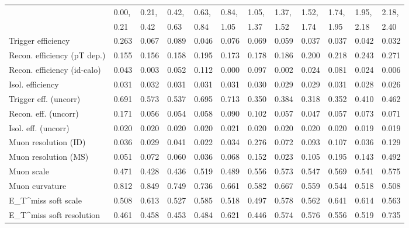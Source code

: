 \begin{tabular}{l|p{0.6cm}p{0.6cm}p{0.6cm}p{0.6cm}p{0.6cm}p{0.6cm}p{0.6cm}p{0.6cm}p{0.6cm}p{0.6cm}p{0.6cm}}
\hline
   & 0.00, & 0.21, & 0.42, & 0.63, & 0.84, & 1.05, & 1.37, & 1.52, & 1.74, & 1.95, & 2.18,  \\ 
   & 0.21 & 0.42 & 0.63 & 0.84 & 1.05 & 1.37 & 1.52 & 1.74 & 1.95 & 2.18 & 2.40  \\ 
\hline
Trigger efficiency                       & 0.263 & 0.067 & 0.089 & 0.046 & 0.076 & 0.069 & 0.059 & 0.037 & 0.037 & 0.042 & 0.032 \\
Recon. efficiency (pT dep.)              & 0.155 & 0.156 & 0.158 & 0.195 & 0.173 & 0.178 & 0.186 & 0.200 & 0.218 & 0.243 & 0.271 \\
Recon. efficiency (id-calo)              & 0.043 & 0.003 & 0.052 & 0.112 & 0.000 & 0.097 & 0.002 & 0.024 & 0.081 & 0.024 & 0.006 \\
Isol. efficiency                         & 0.031 & 0.032 & 0.031 & 0.031 & 0.031 & 0.030 & 0.029 & 0.029 & 0.031 & 0.028 & 0.026 \\
Trigger eff. (uncorr)                    & 0.691 & 0.573 & 0.537 & 0.695 & 0.713 & 0.350 & 0.384 & 0.318 & 0.352 & 0.410 & 0.462 \\
Recon. eff. (uncorr)                     & 0.171 & 0.056 & 0.054 & 0.058 & 0.090 & 0.102 & 0.057 & 0.047 & 0.057 & 0.073 & 0.071 \\
Isol. eff. (uncorr)                      & 0.020 & 0.020 & 0.020 & 0.020 & 0.021 & 0.020 & 0.020 & 0.020 & 0.020 & 0.019 & 0.019 \\
Muon resolution (ID)                     & 0.036 & 0.029 & 0.041 & 0.022 & 0.034 & 0.276 & 0.072 & 0.093 & 0.107 & 0.036 & 0.129 \\
Muon resolution (MS)                     & 0.051 & 0.072 & 0.060 & 0.036 & 0.068 & 0.152 & 0.023 & 0.105 & 0.195 & 0.143 & 0.492 \\
Muon scale                               & 0.471 & 0.428 & 0.436 & 0.519 & 0.489 & 0.556 & 0.573 & 0.547 & 0.569 & 0.541 & 0.575 \\
Muon curvature                           & 0.812 & 0.849 & 0.749 & 0.736 & 0.661 & 0.582 & 0.667 & 0.559 & 0.544 & 0.518 & 0.508 \\
E_{T}^{miss} soft scale                  & 0.508 & 0.613 & 0.527 & 0.585 & 0.518 & 0.497 & 0.578 & 0.562 & 0.641 & 0.614 & 0.563 \\
E_{T}^{miss} soft resolution             & 0.461 & 0.458 & 0.453 & 0.484 & 0.621 & 0.446 & 0.574 & 0.576 & 0.556 & 0.519 & 0.735 \\

\end{tabular}
